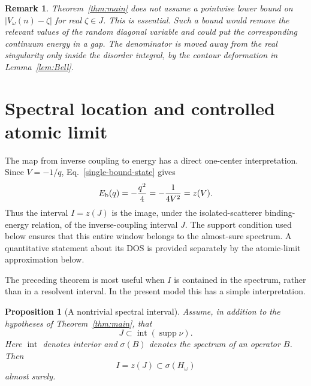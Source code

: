 \documentclass[12pt,a4paper]{article}
\numberwithin{equation}{section}
\newcommand{\supp}{\operatorname{supp}}
\newtheorem{prop}[thm]{Proposition}
\newtheorem{rem}[thm]{Remark}
\begin{document}
\begin{rem}
Theorem~\ref{thm:main} does not assume a pointwise lower bound on
$|V_\omega(n)-\zeta|$ for real $\zeta\in J$.  This is essential.  Such a
bound would remove the relevant values of the random diagonal variable and
could put the corresponding continuum energy in a gap.  The denominator is
moved away from the real singularity only inside the disorder integral, by
the contour deformation in Lemma~\ref{lem:Bell}.
\end{rem}

\section{Spectral location and controlled atomic limit}\label{sec:spectrum}

The map from inverse coupling to energy has a direct one-center
interpretation.  Since $V=-1/q$, Eq.~\eqref{single-bound-state} gives
\begin{equation}
E_{\rm b}(q)=-\frac{q^2}{4}
=-\frac{1}{4V^2}=z(V).
\label{binding-map}
\end{equation}
Thus the interval $I=z(J)$ is the image, under the isolated-scatterer
binding-energy relation, of the inverse-coupling interval $J$.  The support condition used below ensures that this entire window belongs
to the almost-sure spectrum.  A quantitative statement about its DOS is
provided separately by the atomic-limit approximation below.

The preceding theorem is most useful when $I$ is contained in the spectrum,
rather than in a resolvent interval.  In the present model this has a simple
interpretation.

\begin{prop}[A nontrivial spectral interval]\label{prop:spectrum}
Assume, in addition to the hypotheses of Theorem~\ref{thm:main}, that
\begin{equation}
J\subset\operatorname{int}(\supp\nu).
\label{J-support}
\end{equation}
Here $\operatorname{int}$ denotes interior and $\sigma(B)$ denotes the spectrum
of an operator $B$.  Then
$$
I=z(J)\subset\sigma(H_\omega)
$$
almost surely.
\end{prop}
\end{document}
